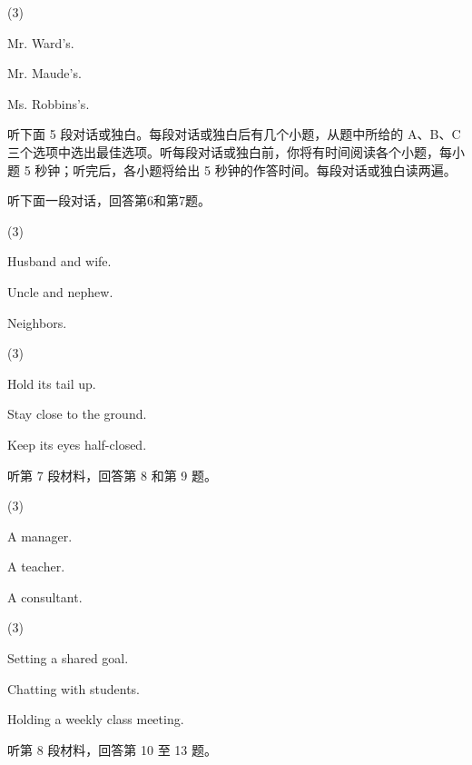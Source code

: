 \documentclass{英语试卷}
\begin{document}
\begin{choices}(3)
  \item Mr. Ward's.
  \item Mr. Maude's.
  \item Ms. Robbins's.
\end{choices}
\par 听下面 5 段对话或独白。每段对话或独白后有几个小题，从题中所给的 A、B、C 三个选项中选出最佳选项。听每段对话或独白前，你将有时间阅读各个小题，每小题 5 秒钟；听完后，各小题将给出 5 秒钟的作答时间。每段对话或独白读两遍。\par
\par 听下面一段对话，回答第6和第7题。\par
{}
\begin{choices}(3)
  \item Husband and wife.
  \item Uncle and nephew.
  \item Neighbors.
\end{choices}
\begin{choices}(3)
  \item Hold its tail up.
  \item Stay close to the ground.
  \item Keep its eyes half-closed.
\end{choices}
\par 听第 7 段材料，回答第 8 和第 9 题。\par
{}
\begin{choices}(3)
  \item A manager.
  \item A teacher.
  \item A consultant.
\end{choices}
\begin{choices}(3)
  \item Setting a shared goal.
  \item Chatting with students.
  \item Holding a weekly class meeting.
\end{choices}
\par 听第 8 段材料，回答第 10 至 13 题。\par
{}
\end{document}
